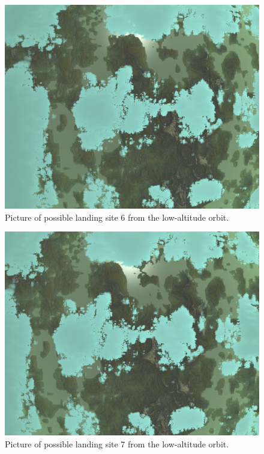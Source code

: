 \documentclass[reprint,english,notitlepage]{revtex4-2}
\begin{document}
    \begin{figure}[h]
        \centering
        \includegraphics[scale=0.14]{Figures/l_site6}
        \caption{Picture of possible landing site 6 from the low-altitude orbit.}\label{fig:l_site6}
    \end{figure}
    \begin{figure}[h]
        \centering
        \includegraphics[scale=0.14]{Figures/l_site7}
        \caption{Picture of possible landing site 7 from the low-altitude orbit.}\label{fig:l_site7}
    \end{figure}
\end{document}
